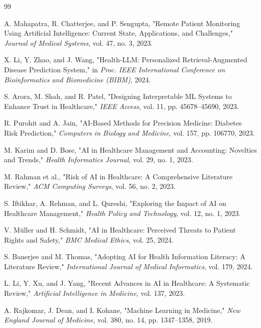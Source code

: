 \documentclass[conference]{IEEEtran}
\begin{document}
\begin{thebibliography}{99}

A. Mahapatra, R. Chatterjee, and P. Sengupta, "Remote Patient Monitoring Using Artificial Intelligence: Current State, Applications, and Challenges," \textit{Journal of Medical Systems}, vol. 47, no. 3, 2023.

X. Li, Y. Zhao, and J. Wang, "Health-LLM: Personalized Retrieval-Augmented Disease Prediction System," in \textit{Proc. IEEE International Conference on Bioinformatics and Biomedicine (BIBM)}, 2024.

S. Arora, M. Shah, and R. Patel, "Designing Interpretable ML Systems to Enhance Trust in Healthcare," \textit{IEEE Access}, vol. 11, pp. 45678–45690, 2023.

R. Purohit and A. Jain, "AI-Based Methods for Precision Medicine: Diabetes Risk Prediction," \textit{Computers in Biology and Medicine}, vol. 157, pp. 106770, 2023.

M. Karim and D. Bose, "AI in Healthcare Management and Accounting: Novelties and Trends," \textit{Health Informatics Journal}, vol. 29, no. 1, 2023.

M. Rahman et al., "Risk of AI in Healthcare: A Comprehensive Literature Review," \textit{ACM Computing Surveys}, vol. 56, no. 2, 2023.

S. Iftikhar, A. Rehman, and L. Qureshi, "Exploring the Impact of AI on Healthcare Management," \textit{Health Policy and Technology}, vol. 12, no. 1, 2023.

V. Müller and H. Schmidt, "AI in Healthcare: Perceived Threats to Patient Rights and Safety," \textit{BMC Medical Ethics}, vol. 25, 2024.

S. Banerjee and M. Thomas, "Adopting AI for Health Information Literacy: A Literature Review," \textit{International Journal of Medical Informatics}, vol. 179, 2024.

L. Li, Y. Xu, and J. Yang, "Recent Advances in AI in Healthcare: A Systematic Review," \textit{Artificial Intelligence in Medicine}, vol. 137, 2023.

A. Rajkomar, J. Dean, and I. Kohane, "Machine Learning in Medicine," \textit{New England Journal of Medicine}, vol. 380, no. 14, pp. 1347–1358, 2019.


\end{thebibliography}
\end{document}
